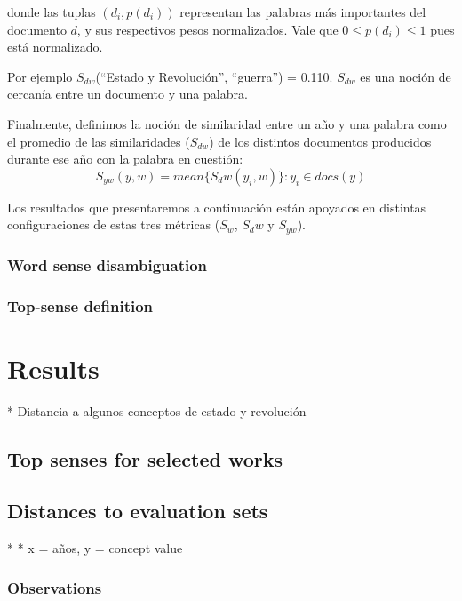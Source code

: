 \documentclass{pnastwo}
\begin{document}
\begin{article}
donde las tuplas $(d_i , p(d_i))$ representan las palabras más importantes del documento $d$, y sus respectivos pesos normalizados. Vale que $0 \leq p(d_i) \leq 1$ pues está normalizado.

Por ejemplo $S_{dw}$(“Estado y Revolución”, “guerra”) = 0.110. $S_{dw}$ es una noción de cercanía entre un documento y una palabra.

Finalmente, definimos la noción de similaridad entre un año y una palabra como el promedio de las similaridades ($S_{dw}$) 
de los distintos documentos producidos durante ese año con la palabra en cuestión:
\begin{equation}
  S_{yw}(y, w) = mean \{ S_dw(y_i, w) \} : y_i \in docs(y) 
\end{equation}

Los resultados que presentaremos a continuaci\'on est\'an apoyados en distintas configuraciones de estas tres m\'etricas ($S_w$, $S_dw$ y $S_{yw}$).

% 


\subsubsection{Word sense disambiguation}

\subsubsection{Top-sense definition}



\section{Results}
* Distancia a algunos conceptos de estado y revolución

\subsection{Top senses for selected works}

\subsection{Distances to evaluation sets}
*
* x = {años}, y = {concept value}

\subsubsection{Observations}


\end{article}
\end{document}

